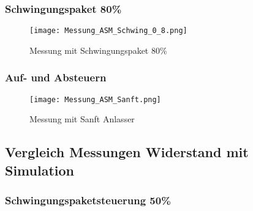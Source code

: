\begin{appendix}
\newpage
\subsubsection*{Schwingungspaket 80\%}
\begin{figure}[ht!]
	\centering
	\texttt{[image: Messung\_ASM\_Schwing\_0\_8.png]}	
	\caption{Messung mit Schwingungspaket 80\%}\label{fig:Mess_ASM_Schwing_0_8}
\end{figure}

\newpage
\subsubsection*{Auf- und Absteuern}
\begin{figure}[ht!]
	\centering
	\texttt{[image: Messung\_ASM\_Sanft.png]}	
	\caption{Messung mit Sanft Anlasser}\label{fig:Mess_ASM_Sanft}
\end{figure}

\newpage
\subsection{Vergleich Messungen Widerstand mit Simulation}
\subsubsection*{Schwingungspaketsteuerung 50\%} \label{sec:Vergleich_Mess_Sim_Schwing_50}


\end{appendix}
